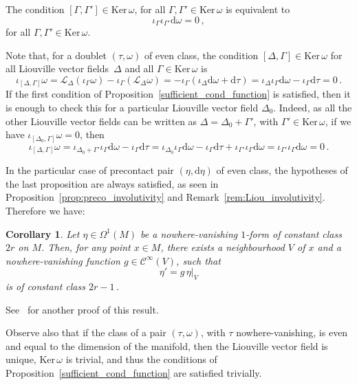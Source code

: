\documentclass[11pt,twoside]{article}
\theoremstyle{plain}
\newtheorem{corollary}[theorem]{Corollary}
\theoremstyle{definition}
\renewcommand{\d}{\mathrm{d}}
\newcommand{\Cinfty}{\mathscr{C}^\infty}
\newcommand*{\inn}[1]{\iota_{#1}}
\newcommand{\Lie}{\mathscr{L}}
\def\d{\mathrm{d}}
\def\d{\mathrm{d}}
\def\Ker{\mathrm{Ker \,}}
\def\Lie{\mathscr{L}}
\begin{document}
The condition $[\Gamma,\Gamma']\in \Ker \omega$, for all $\Gamma,\Gamma' \in \Ker \omega$ is equivalent to
$$\inn{\Gamma}\inn{\Gamma'}\d\omega = 0\,,$$
for all $\Gamma, \Gamma' \in \Ker \omega$.

Note that, for a doublet $(\tau,\omega)$ of even class,
the condition $[\Delta, \Gamma] \in \Ker \omega$ for all Liouville vector fields~$\Delta$ and all $\Gamma \in \Ker \omega$ is
$$\inn{[\Delta, \Gamma]} \omega = \Lie_{\Delta} (\inn{\Gamma}\omega) - \inn{\Gamma} (\Lie_{\Delta} \omega) = -\inn{\Gamma} (\inn{\Delta} \d \omega + \d\tau)= \inn{\Delta} \inn{\Gamma} \d \omega -\inn{\Gamma} \d \tau= 0\,.$$
If the first condition of Proposition~\ref{sufficient_cond_function} is satisfied, then it is enough to check this for a particular Liouville vector field $\Delta_0$. Indeed, as all the other Liouville vector fields can be written as $\Delta = \Delta_0 + \Gamma'$, with $\Gamma' \in \Ker \omega$, if we have $\inn{[\Delta_0, \Gamma]} \omega=0$, then
$$\inn{[\Delta, \Gamma]} \omega= \inn{\Delta_0+ \Gamma'} \inn{\Gamma} \d \omega -\inn{\Gamma} \d \tau=\inn{\Delta_0} \inn{\Gamma} \d \omega -\inn{\Gamma} \d \tau+ \inn{\Gamma'}\inn{\Gamma}\d\omega = \inn{\Gamma'}\inn{\Gamma}\d \omega=0\,.$$

In the particular case of precontact pair $(\eta,\d \eta)$ of even class, 
the hypotheses of the last proposition are always satisfied, 
as seen in Proposition~\ref{prop:preco_involutivity} and Remark~\ref{rem:Liou_involutivity}.
Therefore we have:

\begin{corollary}\label{existence_of_f}
    Let $\eta \in \Omega^{1}(M)$ be a nowhere-vanishing $1$-form of constant class $2r$ on $M$. Then, for any point $x\in M $, there exists a neighbourhood $V$ of $x$ and a nowhere-vanishing function $g\in \Cinfty(V)$, such that 
    $$\eta'=g\, \eta |_V$$
    is of constant class $2r-1$\,.
\end{corollary}
See~\cite{god_1969} for another proof of this result. 

Observe also that if the class of a pair $(\tau,\omega)$, with $\tau$ nowhere-vanishing, is even and equal to the dimension of the manifold, then the Liouville vector field is unique, $\Ker \omega$ is trivial, and thus the conditions of Proposition~\ref{sufficient_cond_function} are satisfied trivially.  
\end{document}
